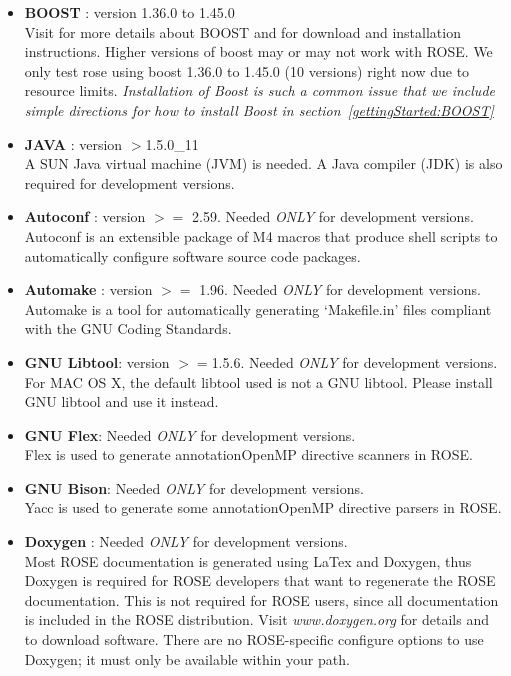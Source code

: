 \begin{itemize}
   \item {\bf BOOST} : version 1.36.0 to 1.45.0 \\
     Visit 
     for more details about BOOST and 
     for download and installation instructions. Higher versions of boost
     may or may not work with ROSE. We only test rose using boost 1.36.0 to 1.45.0 (10
     versions) right now due to resource limits. 
     {\em Installation of Boost is such a common issue that we include simple directions for how to install Boost in section~\ref{gettingStarted:BOOST}}

   \item {\bf JAVA} : version $>$1.5.0\_11 \\
     A SUN Java virtual machine (JVM) is needed. A Java compiler (JDK) is also
     required for development versions.  

   \item {\bf Autoconf} : version $>=$ 2.59. Needed \emph{ONLY} for development versions. \\
     Autoconf is an extensible package of M4 macros that produce shell scripts to automatically configure software source code packages. 

   \item {\bf Automake} : version $>=$ 1.96. Needed \emph{ONLY} for development versions. \\
     Automake is a tool for automatically generating `Makefile.in' files compliant with
     the GNU Coding Standards.

   \item {\bf GNU Libtool}: version $>=$1.5.6.  Needed \emph{ONLY} for development versions. 
   For MAC OS X, the default libtool used is not a GNU libtool. Please
   install GNU libtool and use it instead.

   \item {\bf GNU Flex}: Needed \emph{ONLY} for development versions. \\
   Flex is used to generate annotation\/OpenMP directive scanners in ROSE. 

   \item {\bf GNU Bison}: Needed \emph{ONLY} for development versions. \\
   Yacc is used to generate some annotation\/OpenMP directive parsers in ROSE. 

   \item {\bf Doxygen} : Needed \emph{ONLY} for development versions. \\
          Most ROSE documentation is generated using LaTex and Doxygen, thus
          Doxygen is required for ROSE developers that want to regenerate the ROSE
          documentation. This is not required for ROSE users, since all documentation is 
          included in the ROSE distribution. Visit {\it www.doxygen.org} for details and to
          download software.  There are no ROSE-specific configure options to use Doxygen;
          it must only be available within your path.
 

\end{itemize}
